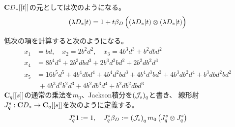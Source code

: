 {	\begin{todo}[描き直し]\label{todo:描き直し} %
	\end{todo} %

	\begin{todo}[ここまで]\label{todo:ここまで} %
	\end{todo} %

	$\mathbf{C} D_*[[t]]$の元としては次のようになる。
	\begin{equation*}\begin{split}
		({\lambda} D_*|t) = 1 + t\beta_D\mathinner{\Bigl({({\lambda}D_*|t)\otimes({\lambda}D_*|t)}\Bigr)}
	\end{split}\end{equation*}

	低次の項を計算すると次のようになる。
	\begin{equation}\label{低次の列挙係数}\begin{split}
		x_1 &= bd,\quad x_2 = 2 b^2d^2,\quad x_3 = 4 b^3d^3 + b^2dbd^2 \\
		x_4 &= 8 b^4d^4 + 2 b^3dbd^3 + 2 b^3d^2bd^2 + 2 b^2db^2d^3 \\
		x_5 &= 16 b^5d^5 + 4 b^4dbd^4 + 4 b^4d^2bd^3 + 4 b^4d^3bd^2 
			+ 4 b^3db^2d^4 + b^3dbd^2bd^2 \\
		&\; + 4 b^3d^2b^2d^3 + 4 b^2db^3d^4 + b^2db^2dbd^3
	\end{split}\end{equation}
	$\mathbf{C}_q[[s]]$の通常の乗法を$m_0$、Jackson積分を$({{\mathcal{J}}}_s)_q$と書き、
	線形射$J_q^s:\mathbf{C} D_*\to\mathbf{C}_q[[s]]$を次のように定義する。
	\begin{equation*}\begin{split}
		J_q^s 1 := 1,\quad 
		J_q^s\beta_D := \mathinner{\left({{\ensuremath{{\mathcal{J}}}}_s}\right)}_qm_0\mathinner{\left({J_q^s\otimes J_q^s}\right)}
	\end{split}\end{equation*}

}
